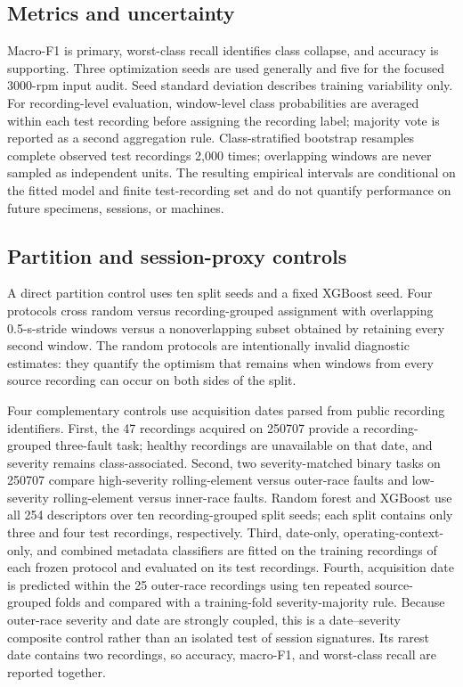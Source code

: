 \documentclass[machines,article,submit,oneauthor]{Definitions/mdpi}
\begin{document}
\subsection{Metrics and uncertainty}
Macro-F1 is primary, worst-class recall identifies class collapse, and accuracy is supporting. Three optimization seeds are used generally and five for the focused 3000-rpm input audit. Seed standard deviation describes training variability only. For recording-level evaluation, window-level class probabilities are averaged within each test recording before assigning the recording label; majority vote is reported as a second aggregation rule. Class-stratified bootstrap resamples complete observed test recordings 2,000 times; overlapping windows are never sampled as independent units. The resulting empirical intervals are conditional on the fitted model and finite test-recording set and do not quantify performance on future specimens, sessions, or machines.

\subsection{Partition and session-proxy controls}
A direct partition control uses ten split seeds and a fixed XGBoost seed. Four protocols cross random versus recording-grouped assignment with overlapping 0.5-s-stride windows versus a nonoverlapping subset obtained by retaining every second window. The random protocols are intentionally invalid diagnostic estimates: they quantify the optimism that remains when windows from every source recording can occur on both sides of the split.

Four complementary controls use acquisition dates parsed from public recording identifiers. First, the 47 recordings acquired on 250707 provide a recording-grouped three-fault task; healthy recordings are unavailable on that date, and severity remains class-associated. Second, two severity-matched binary tasks on 250707 compare high-severity rolling-element versus outer-race faults and low-severity rolling-element versus inner-race faults. Random forest and XGBoost use all 254 descriptors over ten recording-grouped split seeds; each split contains only three and four test recordings, respectively. Third, date-only, operating-context-only, and combined metadata classifiers are fitted on the training recordings of each frozen protocol and evaluated on its test recordings. Fourth, acquisition date is predicted within the 25 outer-race recordings using ten repeated source-grouped folds and compared with a training-fold severity-majority rule. Because outer-race severity and date are strongly coupled, this is a date--severity composite control rather than an isolated test of session signatures. Its rarest date contains two recordings, so accuracy, macro-F1, and worst-class recall are reported together.
\end{document}

